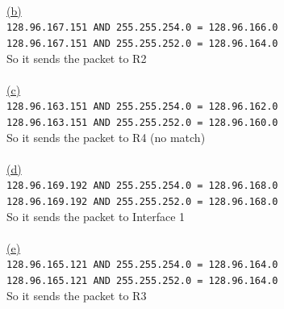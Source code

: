 \documentclass[12pt]{article}
\begin{document}
~\\\hyperlink{toc}{\hypertarget{11.2}{(b)}}\\
\texttt{128.96.167.151 AND 255.255.254.0 = 128.96.166.0}\\
\texttt{128.96.167.151 AND 255.255.252.0 = 128.96.164.0}\\
So it sends the packet to R2\\


~\\\hyperlink{toc}{\hypertarget{11.3}{(c)}}\\
\texttt{128.96.163.151 AND 255.255.254.0 = 128.96.162.0}\\
\texttt{128.96.163.151 AND 255.255.252.0 = 128.96.160.0}\\
So it sends the packet to R4 (no match)\\

~\\\hyperlink{toc}{\hypertarget{11.4}{(d)}}\\
\texttt{128.96.169.192 AND 255.255.254.0 = 128.96.168.0}\\
\texttt{128.96.169.192 AND 255.255.252.0 = 128.96.168.0}\\
So it sends the packet to Interface 1\\

~\\\hyperlink{toc}{\hypertarget{11.5}{(e)}}\\
\texttt{128.96.165.121 AND 255.255.254.0 = 128.96.164.0}\\
\texttt{128.96.165.121 AND 255.255.252.0 = 128.96.164.0}\\
So it sends the packet to R3
\newpage
\end{document}
